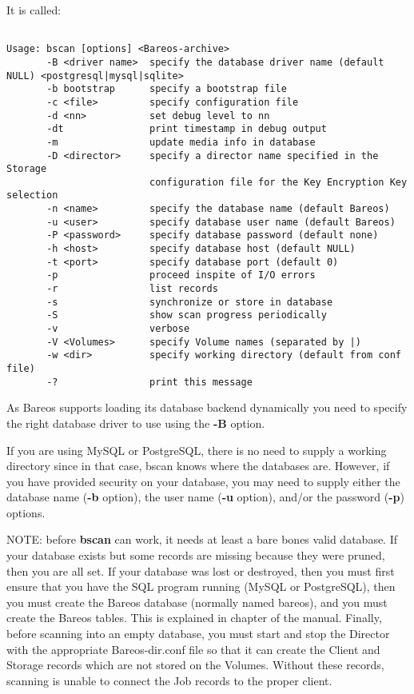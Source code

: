 It is called:

\footnotesize
\begin{verbatim}

Usage: bscan [options] <Bareos-archive>
       -B <driver name>  specify the database driver name (default NULL) <postgresql|mysql|sqlite>
       -b bootstrap      specify a bootstrap file
       -c <file>         specify configuration file
       -d <nn>           set debug level to nn
       -dt               print timestamp in debug output
       -m                update media info in database
       -D <director>     specify a director name specified in the Storage
                         configuration file for the Key Encryption Key selection
       -n <name>         specify the database name (default Bareos)
       -u <user>         specify database user name (default Bareos)
       -P <password>     specify database password (default none)
       -h <host>         specify database host (default NULL)
       -t <port>         specify database port (default 0)
       -p                proceed inspite of I/O errors
       -r                list records
       -s                synchronize or store in database
       -S                show scan progress periodically
       -v                verbose
       -V <Volumes>      specify Volume names (separated by |)
       -w <dir>          specify working directory (default from conf file)
       -?                print this message
\end{verbatim}
\normalsize

As Bareos supports loading its database backend dynamically you need to specify
the right database driver to use using the {\bf -B} option.

If you are using MySQL or PostgreSQL, there is no need to supply a working
directory since in that case, bscan knows where the databases are. However, if
you have provided security on your database, you may need to supply either the
database name ({\bf -b} option), the user name ({\bf -u} option), and/or the
password ({\bf -p}) options.

NOTE: before {\bf bscan} can work, it needs at least a bare bones valid
database.  If your database exists but some records are missing because
they were pruned, then you are all set. If your database was lost or
destroyed, then you must first ensure that you have the SQL program running
(MySQL or PostgreSQL), then you must create the Bareos database (normally
named bareos), and you must create the Bareos tables.
This is explained in
 chapter of the manual. Finally, before
scanning into an empty database, you must start and stop the Director with
the appropriate Bareos-dir.conf file so that it can create the Client and
Storage records which are not stored on the Volumes.  Without these
records, scanning is unable to connect the Job records to the proper
client.

